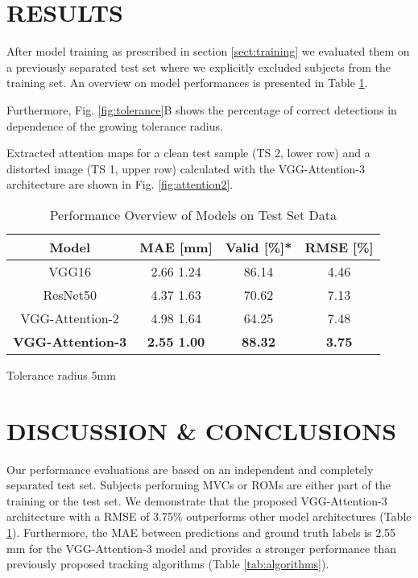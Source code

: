 \documentclass[letterpaper, 10 pt, conference]{ieeeconf}
\begin{document}
\section{RESULTS} 
\label{sect:results}
After model training as prescribed in section \ref{sect:training} we evaluated them on a previously separated test set where we explicitly excluded subjects from the training set. An overview on model performances is presented in Table \ref{tab:results}.

Furthermore, Fig. \ref{fig:tolerance}B shows the percentage of correct detections in dependence of the growing tolerance radius.

Extracted attention maps for a clean test sample (TS 2, lower row) and a distorted image (TS 1, upper row) calculated with the VGG-Attention-3 architecture are shown in Fig. \ref{fig:attention2}. 
\begin{table}[h]
\caption{Performance Overview of Models on Test Set Data}
\label{tab:results}
\begin{center}
\hspace*{-1.55cm}
\renewcommand{\arraystretch}{1.25}
\begin{tabular}{cccc}
\toprule
\textbf{Model}  & \textbf{MAE [mm]} & \textbf{Valid [\%]*} &\textbf{RMSE [\%]}\\ 
\midrule
VGG16 \cite{VGG}  & 2.66  1.24 & 86.14  & 4.46   \\
ResNet50 \cite{ResNet}  & 4.37  1.63   & 70.62  & 7.13   \\
VGG-Attention-2 \cite{Attention}  & 4.98  1.64    & 64.25  &  7.48  \\
\textbf{VGG-Attention-3 \cite{Attention}}  & \textbf{2.55  1.00}    & \textbf{88.32}  &  \textbf{3.75}  \\
\bottomrule
\end{tabular}
\begin{tablenotes}
    \item * Tolerance radius 5mm
    \end{tablenotes}
\end{center}
\end{table}
\section{DISCUSSION \& CONCLUSIONS} 
\label{sect:discussion}
Our performance evaluations are based on an independent and completely separated test set. Subjects performing MVCs or ROMs are either part of the training or the test set. We demonstrate that the proposed VGG-Attention-3 architecture with a RMSE of 3.75\% outperforms other model architectures (Table \ref{tab:results}). Furthermore, the MAE between predictions and ground truth labels is 2.55 mm for the VGG-Attention-3 model and provides a stronger performance than previously proposed tracking algorithms (Table \ref{tab:algorithms}). 
\end{document}
